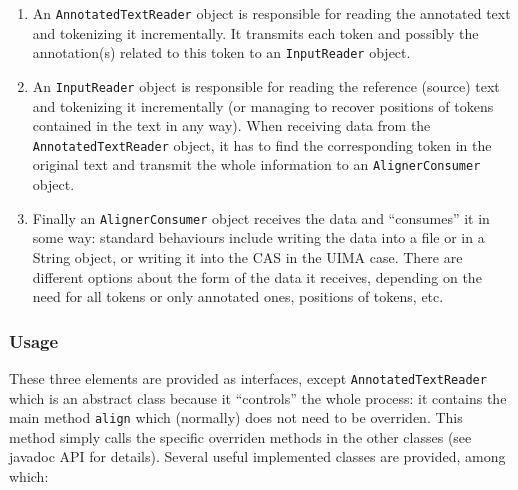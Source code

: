 \documentclass{article}
\newenvironment{xenumerate}{
\begin{enumerate}
  \setlength{\itemsep}{.3\baselineskip}
  \setlength{\topsep}{0pt}
  \setlength{\parskip}{0pt}
  \setlength{\parsep}{0pt}
}{\end{enumerate}}
\begin{document}
\begin{xenumerate}
\item An {\tt AnnotatedTextReader} object is responsible for reading the annotated text and tokenizing it incrementally. It transmits each token and possibly the annotation(s) related to this token to an {\tt InputReader} object.
\item An {\tt InputReader} object is responsible for reading the reference (source) text and tokenizing it incrementally (or managing to recover positions of tokens contained in the text in any way). When receiving data from the {\tt AnnotatedTextReader} object, it has to find the corresponding token in the original text and transmit the whole information to an {\tt AlignerConsumer} object.
\item Finally an {\tt AlignerConsumer} object receives the data and ``consumes'' it in some way: standard behaviours include writing the data into a file or in a String object, or writing it into the CAS in the UIMA case. There are different options about the form of the data it receives, depending on the need for all tokens or only annotated ones, positions of tokens, etc.
\end{xenumerate}

\subsubsection{Usage}

These three elements are provided as interfaces, except {\tt AnnotatedTextReader} which is an abstract class because it ``controls'' the whole process: it contains the main method {\tt align} which (normally) does not need to be overriden. This method simply calls the specific overriden methods in the other classes (see javadoc API for details). Several useful implemented classes are provided, among which:
\end{document}
